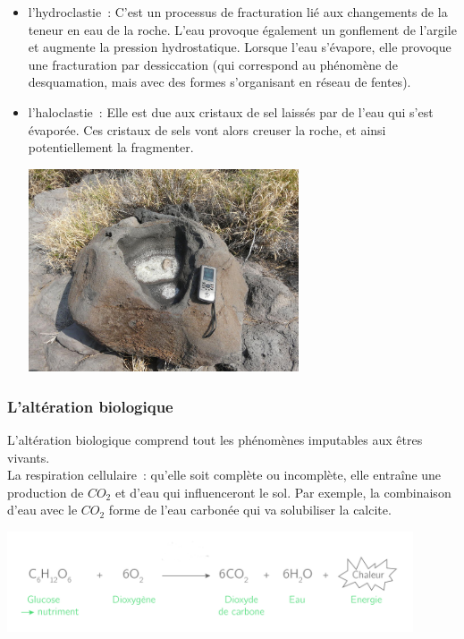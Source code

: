 \documentclass[a4paper,11pt]{article}
\begin{document}
\begin{itemize}
  \item l'hydroclastie~: C'est un processus de fracturation lié aux changements de la teneur en eau de la roche. L'eau provoque également un gonflement de l'argile et augmente la pression hydrostatique.
  Lorsque l'eau s'évapore, elle provoque une fracturation par dessiccation (qui correspond au phénomène de desquamation, mais avec des formes s'organisant en réseau de fentes).  
  \item l'haloclastie~: Elle est due aux cristaux de sel laissés par de l'eau qui s'est évaporée. Ces cristaux de sels vont alors creuser la roche, et ainsi potentiellement la fragmenter.

  \medbreak
  \begin{center}
    \includegraphics[width=8cm]{Images/Erosion/Haloclastie_vasque_basalte_Hawaii.jpg}
  \end{center}
  \medbreak

\end{itemize}

\subsubsection{L'altération biologique}

L'altération biologique comprend tout les phénomènes imputables aux êtres vivants. \\
La respiration cellulaire~: qu'elle soit complète ou incomplète, elle entraîne une production de $CO_2$ et d'eau qui influenceront le sol.
Par exemple, la combinaison d'eau avec le $CO_2$ forme de l'eau carbonée qui va solubiliser la calcite.

\begin{center}
  \includegraphics[width=12cm]{Images/Erosion/Respiration_cellulaire.png}
\end{center}
\end{document}
